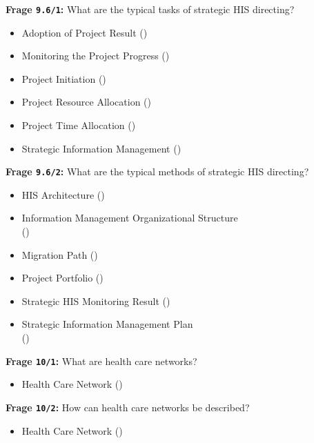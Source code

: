 \textbf{Frage \texttt{9.6/1}:} What are the typical tasks of strategic HIS directing?

\begin{itemize}
  \item Adoption of Project Result ()
  \item Monitoring the Project Progress ()
  \item Project Initiation ()
  \item Project Resource Allocation ()
  \item Project Time Allocation ()
  \item Strategic Information Management ()
\end{itemize}

\textbf{Frage \texttt{9.6/2}:} What are the typical methods of strategic HIS directing?

\begin{itemize}
  \item HIS Architecture ()
  \item Information Management Organizational Structure \\
  ()
  \item Migration Path ()
  \item Project Portfolio ()
  \item Strategic HIS Monitoring Result ()
  \item Strategic Information Management Plan \\
  ()
\end{itemize}

\textbf{Frage \texttt{10/1}:} What are health care networks?

\begin{itemize}
  \item Health Care Network ()
\end{itemize}

\textbf{Frage \texttt{10/2}:} How can health care networks be described?

\begin{itemize}
  \item Health Care Network ()
\end{itemize}

